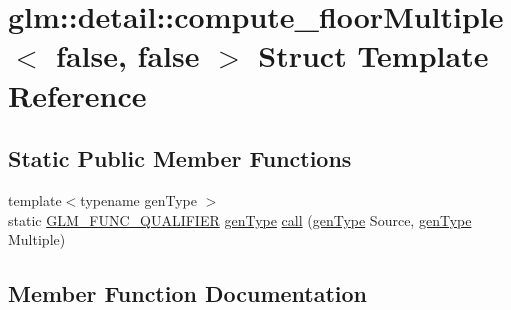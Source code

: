 \hypertarget{structglm_1_1detail_1_1compute__floor_multiple_3_01false_00_01false_01_4}{}\section{glm\+:\+:detail\+:\+:compute\+\_\+floor\+Multiple$<$ false, false $>$ Struct Template Reference}
\label{structglm_1_1detail_1_1compute__floor_multiple_3_01false_00_01false_01_4}
\subsection*{Static Public Member Functions}
\begin{DoxyCompactItemize}
\item 
{\footnotesize template$<$typename gen\+Type $>$ }\\static \hyperlink{setup_8hpp_a33fdea6f91c5f834105f7415e2a64407}{G\+L\+M\+\_\+\+F\+U\+N\+C\+\_\+\+Q\+U\+A\+L\+I\+F\+I\+ER} \hyperlink{structglm_1_1detail_1_1gen_type}{gen\+Type} \hyperlink{structglm_1_1detail_1_1compute__floor_multiple_3_01false_00_01false_01_4_a795b0efa8ebff0dcbbc055cdccd2156c}{call} (\hyperlink{structglm_1_1detail_1_1gen_type}{gen\+Type} Source, \hyperlink{structglm_1_1detail_1_1gen_type}{gen\+Type} Multiple)
\end{DoxyCompactItemize}


\subsection{Member Function Documentation}
\mbox{\label{structglm_1_1detail_1_1compute__floor_multiple_3_01false_00_01false_01_4_a795b0efa8ebff0dcbbc055cdccd2156c}} 
